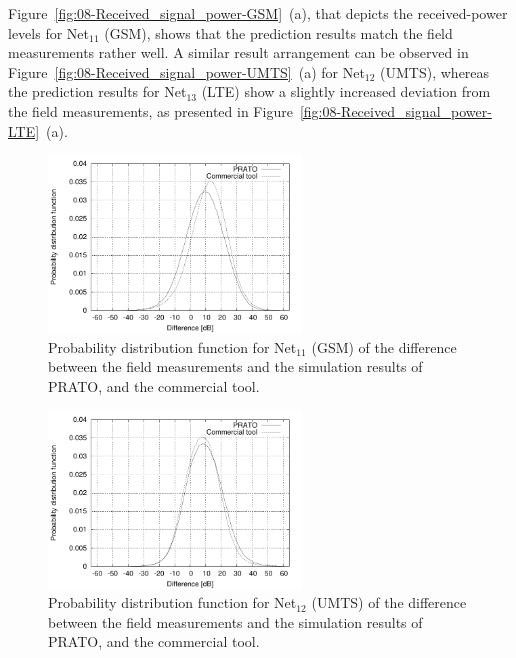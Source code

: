 Figure~\ref{fig:08-Received_signal_power-GSM}~(a), that depicts
the received-power levels for Net$_{11}$ (GSM), shows that the prediction
results match the field measurements rather well. A similar result
arrangement can be observed in Figure~\ref{fig:08-Received_signal_power-UMTS}~(a)
for Net$_{12}$ (UMTS), whereas the prediction results for Net$_{13}$
(LTE) show a slightly increased deviation from the field measurements,
as presented in Figure~\ref{fig:08-Received_signal_power-LTE}~(a).

\begin{figure}[h]
\centering

\includegraphics[width=0.6\textwidth]{08-real_network_planning/img/gsm_diff}

\caption{Probability distribution function for Net$_{11}$ (GSM) of the difference
between the field measurements and the simulation results of PRATO,
and the commercial tool. \label{fig:08-Prediction_difference-GSM}}
\end{figure}


\begin{figure}[h]
\centering

\includegraphics[width=0.6\textwidth]{08-real_network_planning/img/umts_diff}

\caption{Probability distribution function for Net$_{12}$ (UMTS) of the difference
between the field measurements and the simulation results of PRATO,
and the commercial tool.\label{fig:08-Prediction_difference-UMTS}}
\end{figure}


